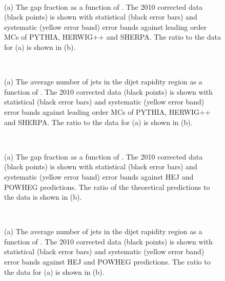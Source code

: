 \begin{figure}
\centering
\mbox{
              \quad
              \quad
                              }
\caption[]{
(a) The gap fraction as a function of \dy{}.  
The 2010 corrected data (black points) is shown with statistical (black error bars) and systematic (yellow error band) error bands against leading order MCs of PYTHIA, HERWIG++ and SHERPA.
The ratio to the data for (a)  is shown in (b).
\label{GBJ2:FinalPlots:GapFracLO}}
\end{figure}

\begin{figure}
\centering
\mbox{
              \quad
              \quad
                              }
\caption[]{
(a) The average number of jets in the dijet rapidity region as a function of \dy{}.  
The 2010 corrected data (black points) is shown with statistical (black error bars) and systematic (yellow error band) error bands against leading order MCs of PYTHIA, HERWIG++ and SHERPA.
The ratio to the data for (a) is shown in (b).
\label{GBJ2:FinalPlots:NJetLO}}
\end{figure}

\begin{figure}
\centering
\mbox{
              \quad
              \quad
                              }
\caption[]{
(a) The gap fraction as a function of \dy{}.  
The 2010 corrected data (black points) is shown with statistical (black error bars) and systematic (yellow error band) error bands against HEJ and POWHEG predictions.
The ratio of the theoretical predictions to the data is shown in (b).
\label{GBJ2:FinalPlots:GapFrac}}
\end{figure}



\begin{figure}
\centering
\mbox{
              \quad
              \quad
                              }
\caption[]{
(a) The average number of jets in the dijet rapidity region as a function of \dy{}.  
The 2010 corrected data (black points) is shown with statistical (black error bars) and systematic (yellow error band) error bands against HEJ and POWHEG predictions.
The ratio to the data for (a) is shown in (b). 
\label{GBJ2:FinalPlots:nJets}}
\end{figure}

